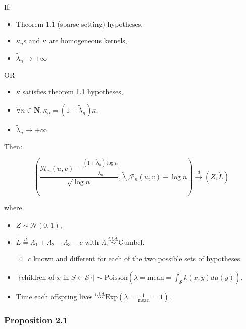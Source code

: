 \documentclass[
  letterpaper,
  DIV=11,
  numbers=noendperiod]{scrartcl}
\providecommand{\tightlist}{%
  \setlength{\itemsep}{0pt}\setlength{\parskip}{0pt}}\usepackage{longtable,booktabs,array}
\begin{document}
If:

\begin{itemize}
\item
  Theorem 1.1 (sparse setting) hypotheses,
\item
  \(\kappa_n\)s and \(\kappa\) are homogeneous kernels,
\item
  \(\tilde{\lambda}_n \to +\infty\)
\end{itemize}

OR

\begin{itemize}
\item
  \(\kappa\) satisfies theorem 1.1 hypotheses,
\item
  \(\forall n \in \mathbf{N}, \kappa_n = (1 + \tilde{\lambda}_n) \kappa,\)
\item
  \(\tilde{\lambda}_n \to +\infty\)
\end{itemize}

Then:

\[
\left( \frac{\mathcal{H}_n(u, v) - \frac{(1 + \tilde{\lambda}_n) \log n}{\tilde{\lambda}_n}}{\sqrt{\log n}}, \tilde{\lambda}_n \mathcal{P}_n(u, v) - \log n\right) \xrightarrow{d} (Z, \tilde{L})
\]

where

\begin{itemize}
\item
  \(Z \sim \mathcal{N}(0, 1),\)
\item
  \(\tilde{L} \stackrel{d}{=} \Lambda_1 + \Lambda_2 - \Lambda_3 - c\)
  with \(\Lambda_i \stackrel{\textit{i.i.d.}}{\sim} \text{Gumbel}\).

  \begin{itemize}
  \tightlist
  \item
    \(c\) known and different for each of the two possible sets of
    hypotheses.
  \end{itemize}
\end{itemize}

\begin{itemize}
\item
  \(|\{\)children of \(x\) in
  \(S \subset \mathcal{S}\}| \sim \text{Poisson}(\lambda= \text{mean} = \int_{\mathcal{S}} k(x, y) d\mu(y)).\)
\item
  Time each offspring lives
  \(\stackrel{\textit{i.i.d.}}{\sim} \text{Exp}(\lambda = \frac{1}{\text{mean}} = 1).\)
\end{itemize}

\subsubsection{Proposition 2.1}\label{proposition-2.1}
\end{document}
